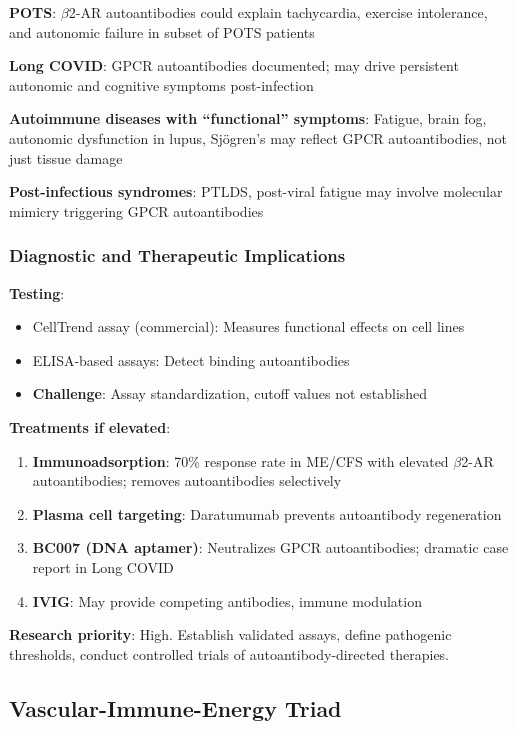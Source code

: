 \textbf{POTS}: $\beta$2-AR autoantibodies could explain tachycardia, exercise intolerance, and autonomic failure in subset of POTS patients

\textbf{Long COVID}: GPCR autoantibodies documented; may drive persistent autonomic and cognitive symptoms post-infection

\textbf{Autoimmune diseases with ``functional'' symptoms}: Fatigue, brain fog, autonomic dysfunction in lupus, Sjögren's may reflect GPCR autoantibodies, not just tissue damage

\textbf{Post-infectious syndromes}: PTLDS, post-viral fatigue may involve molecular mimicry triggering GPCR autoantibodies

\subsubsection{Diagnostic and Therapeutic Implications}

\textbf{Testing}:
\begin{itemize}
    \item CellTrend assay (commercial): Measures functional effects on cell lines
    \item ELISA-based assays: Detect binding autoantibodies
    \item \textbf{Challenge}: Assay standardization, cutoff values not established
\end{itemize}

\textbf{Treatments if elevated}:
\begin{enumerate}
    \item \textbf{Immunoadsorption}: 70\% response rate in ME/CFS with elevated $\beta$2-AR autoantibodies; removes autoantibodies selectively
    \item \textbf{Plasma cell targeting}: Daratumumab prevents autoantibody regeneration
    \item \textbf{BC007 (DNA aptamer)}: Neutralizes GPCR autoantibodies; dramatic case report in Long COVID
    \item \textbf{IVIG}: May provide competing antibodies, immune modulation
\end{enumerate}

\textbf{Research priority}: High. Establish validated assays, define pathogenic thresholds, conduct controlled trials of autoantibody-directed therapies.

\subsection{Vascular-Immune-Energy Triad}
\label{sec:triad-translational}

